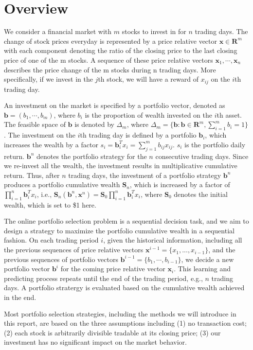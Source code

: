 \section{Overview}
We consider a financial market with $m$ stocks to invest in for $n$ trading days.  The change of stock prices everyday is represented by a price relative vector $\textbf{x} \in \textbf{R}^m$ with each component denoting the ratio of the closing price to the last closing price of one of the m stocks. A sequence of these price relative vectors $\textbf{x}_1, \cdots, \textbf{x}_n$ describes the price change of the m stocks during n trading days. More specifically, if we invest in the $j$th stock, we will have a reward of $x_{ij}$ on the $i$th trading day.

An investment on the market is specified by a portfolio vector, denoted as $\textbf{b}=(b_1,\cdots,b_m)$, where $b_i$ is the proportion of wealth invested on the $i$th asset. The feasible space of $\textbf{b}$ is denoted by $\Delta_m$, where $\Delta_m =\{\textbf{b}:\textbf{b} \in \textbf{R}^m, \sum_{i=1}^m b_i=1\}$. The investment on the $i$th trading day is defined by a portfolio $\textbf{b}_i$, which increases the wealth by a factor $s_i = \textbf{b}_i^{T}x_i = \sum_{j=1}^m b_{ij}x_{ij}$.  $s_i$ is the portfolio daily return. $\textbf{b}^n$ denotes the portfolio strategy for the $n$ consecutive trading days. Since we re-invest all the wealth, the investment results in multiplicative cumulative return. Thus, after $n$ trading days, the investment of a portfolio strategy $\textbf{b}^n$ produces a portfolio cumulative wealth $\textbf{S}_n$, which is increased by a factor of $\prod_{i=1}^n\textbf{b}_i^T x_i$, i.e., $\textbf{S}_n(\textbf{b}^n,\textbf{x}^n) = \textbf{S}_0\prod_{i=1}^n\textbf{b}_i^T x_i$, where $\textbf{S}_0$ denotes the initial wealth, which is set to \$1 here.

The online portfolio selection problem is a sequential decision task, and we aim to design a strategy to maximize the portfolio cumulative wealth in a sequential fashion. On each trading period $i$, given the historical information, including all the previous sequences of price relative vectors $\textbf{x}^{i-1} =\{x_1 , . . . , x_{i-1} \}$, and the previous sequences of portfolio vectors $\textbf{b}^{i-1} =\{b_1 , \cdots, b_{i-1}\}$, we decide a new portfolio vector $\textbf{b}^i$ for the coming price relative vector $\textbf{x}_i$. This learning and predicting process repeats until the end of the trading period, e.g., $n$ trading days. A portfolio stratergy is evaluated based on the cumulative wealth achieved in the end.

Most portfolio selection strategies, including the methods we will introduce in this report, are based on the three assumptions including (1) no transaction cost; (2) each stock is arbitrarily divisible tradable at its closing price; (3) our investment has no significant impact on the market behavior.



